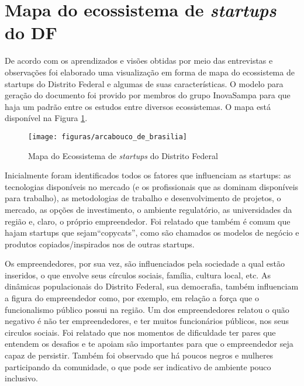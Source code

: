 \section{Mapa do ecossistema de \textit{startups} do DF}
\label{mapa_do_ecossistema_do_distrito_federal}

De acordo com os aprendizados e visões obtidas por meio das entrevistas e observações foi elaborado uma visualização em forma de mapa do ecossistema de startups do Distrito Federal e algumas de suas características. O modelo para geração do documento foi provido por membros do grupo InovaSampa para que haja um padrão entre os estudos entre diversos ecossistemas. O mapa está disponível na Figura \ref{figure:mapa_do_ecossistema}.

\begin{figure}[!htb]
	\centering
	\texttt{[image: figuras/arcabouco\_de\_brasilia]}
	\caption{Mapa do Ecossistema de \textit{startups} do Distrito Federal}
	\label{figure:mapa_do_ecossistema}
\end{figure} 

Inicialmente foram identificados todos os fatores que influenciam as startups: as tecnologias disponíveis no mercado (e os profissionais que as dominam disponíveis para trabalho), as metodologias de trabalho e desenvolvimento de projetos, o mercado, as opções de investimento, o ambiente regulatório, as universidades da região e, claro, o próprio empreendedor. Foi relatado que também é comum que hajam startups que sejam``copycats'', como são chamados os modelos de negócio e produtos copiados/inspirados nos de outras startups.

Os empreendedores, por sua vez, são influenciados pela sociedade a qual estão inseridos, o que envolve seus círculos sociais, família, cultura local, etc. As dinâmicas populacionais do Distrito Federal, sua democrafia, também influenciam a figura do empreendedor como, por exemplo, em relação a força que o funcionalismo público possui na região. Um dos empreendedores relatou o quão negativo é não ter empreendedores, e ter muitos funcionários públicos, nos seus circulos sociais. Foi relatado que nos momentos de dificuldade ter pares que entendem os desafios e te apoiam são importantes para que o empreendedor seja capaz de persistir. Também foi observado que há poucos negros e mulheres participando da comunidade, o que pode ser indicativo de ambiente pouco inclusivo. 

